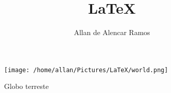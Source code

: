 \documentclass[12pt, a4paper]{article}
\begin{document}
\title{LaTeX}
\author{Allan de Alencar Ramos}
\maketitle

\begin{figure}[h]
\centering
\texttt{[image: /home/allan/Pictures/LaTeX/world.png]}
\label{Globo terreste}
\caption{Globo terreste}
\end{figure}
\end{document}
